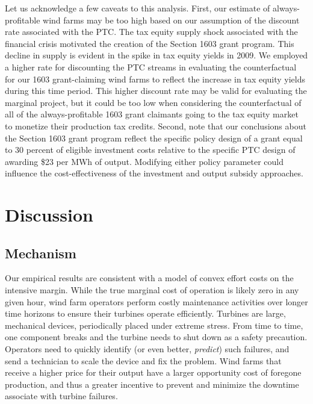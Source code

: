\documentclass[12pt]{article}
\begin{document}
Let us acknowledge a few caveats to this analysis. First, our estimate of always-profitable wind farms may be too high based on our assumption of the discount rate associated with the PTC. The tax equity supply shock associated with the financial crisis motivated the creation of the Section 1603 grant program. This decline in supply is evident in the spike in tax equity yields in 2009. We employed a higher rate for discounting the PTC streams in evaluating the counterfactual for our 1603 grant-claiming wind farms to reflect the increase in tax equity yields during this time period. This higher discount rate may be valid for evaluating the marginal project, but it could be too low when considering the counterfactual of all of the always-profitable 1603 grant claimants going to the tax equity market to monetize their production tax credits. Second, note that our conclusions about the Section 1603 grant program reflect the specific policy design of a grant equal to 30 percent of eligible investment costs relative to the specific PTC design of awarding \$23 per MWh of output. Modifying either policy parameter could influence the cost-effectiveness of the investment and output subsidy approaches. 

\section{Discussion\label{sec:Discussion}}

\subsection{Mechanism \label{sec:Mechanism}}

Our empirical results are consistent with a model of convex effort costs on the intensive margin. While the true marginal cost of operation is likely zero in any given hour, wind farm operators perform costly maintenance activities over longer time horizons to ensure their turbines operate efficiently. Turbines are large, mechanical devices, periodically placed under extreme stress. From time to time, one component breaks and the turbine needs to shut down as a safety precaution. Operators need to quickly identify (or even better, \textit{predict}) such failures, and send a technician to scale the device and fix the problem. Wind farms that receive a higher price for their output have a larger opportunity cost of foregone production, and thus a greater incentive to prevent and minimize the downtime associate with turbine failures. 
\end{document}
